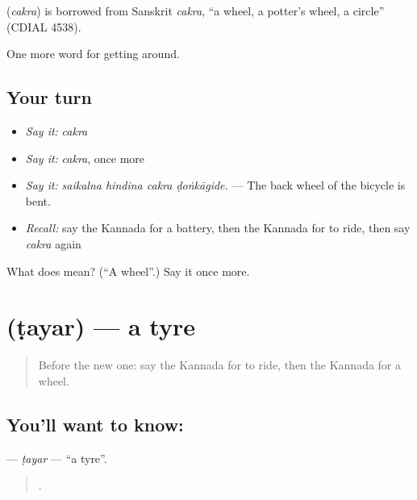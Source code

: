 \begin{cousinweb}
\textbf{} (\emph{cakra}) is borrowed from Sanskrit \emph{cakra}, \textquotedblleft{}a wheel, a potter's wheel, a circle\textquotedblright{} (CDIAL 4538).
\end{cousinweb}

\begin{grammarlens}[title={What you've built}]
One more word for getting around.
\end{grammarlens}

\subsection*{Your turn}
\begin{itemize}
\raggedright
  \item \emph{Say it:} \emph{cakra}
  \item \emph{Say it:} \emph{cakra}, once more
  \item \emph{Say it:} \emph{saikalna hindina cakra ḍoṅkāgide.} — The back wheel of the bicycle is bent.
  \item \emph{Recall:} say the Kannada for a battery, then the Kannada for to ride, then say \emph{cakra} again
\end{itemize}

\begin{tcolorbox}[breakable,colback=teal!4,colframe=teal!35!black,title={Before you move on}]
What does  mean? (\textquotedblleft{}A wheel\textquotedblright{}.) Say it once more.
\end{tcolorbox}
\section[\texorpdfstring{\kn{ಟಯರ್} (ṭayar)}{ಟಯರ್ (ṭayar)}]{ (ṭayar) — a tyre}

\label{lesson:KA-C449-tayar}



\begin{quote}
Before the new one: say the Kannada for to ride, then the Kannada for a wheel.
\end{quote}

\subsection*{You'll want to know: }
\textbf{} — \emph{ṭayar} — \textquotedblleft{}a tyre\textquotedblright{}.

\begin{quote}
  .
\end{quote}

